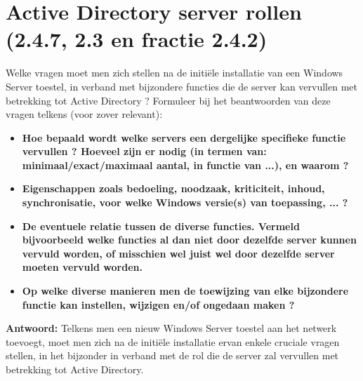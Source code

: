 \chapter{Active Directory server rollen (2.4.7, 2.3 en fractie 2.4.2)}
Welke vragen moet men zich stellen na de initiële installatie van een Windows Server toestel, in verband met bijzondere functies die de server kan vervullen met betrekking tot Active Directory ? Formuleer bij het beantwoorden van deze vragen telkens (voor zover relevant):
\begin{itemize}
\item \textbf{Hoe bepaald wordt welke servers een dergelijke specifieke functie vervullen ? Hoeveel zijn er nodig (in termen van: minimaal/exact/maximaal aantal, in functie van ...), en waarom ?}
\item \textbf{Eigenschappen zoals bedoeling, noodzaak, kriticiteit, inhoud, synchronisatie, voor welke Windows versie(s) van toepassing, ... ?}
\item \textbf{De eventuele relatie tussen de diverse functies. Vermeld bijvoorbeeld welke functies al dan niet door dezelfde server kunnen vervuld worden, of misschien wel juist wel door dezelfde server moeten vervuld worden.}
\item \textbf{Op welke diverse manieren men de toewijzing van elke bijzondere functie kan instellen, wijzigen en/of ongedaan maken ?}
\end{itemize}
\clearpage
\textbf{Antwoord:}
Telkens men een nieuw Windows Server toestel aan het netwerk toevoegt, moet men zich na de initi\"ele installatie ervan enkele cruciale vragen stellen, in het bijzonder in verband met de rol die de server zal vervullen met betrekking tot Active Directory.

